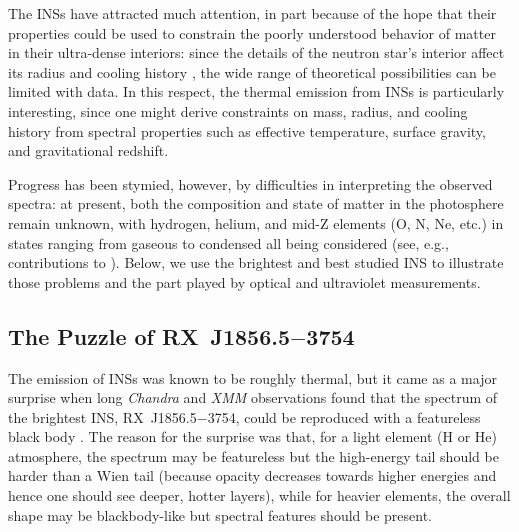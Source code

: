 \documentclass[iop]{emulateapj}
\newcommand{\rxjw}{RX~J1856.5$-$3754}
\begin{document}
The INSs have attracted much attention, in part because of the hope
that their properties could be used to constrain the poorly understood
behavior of matter in their ultra-dense interiors: since the details
of the neutron star's interior affect its radius \citep{lp07} and
cooling history \citep{yp04}, the wide range of theoretical
possibilities can be limited with data.  In this respect, the thermal
emission from INSs is particularly interesting, since one might derive
constraints on mass, radius, and cooling history from spectral
properties such as effective temperature, surface gravity, and
gravitational redshift.

Progress has been stymied, however, by difficulties in interpreting
the observed spectra: at present, both the composition and state of
matter in the photosphere remain unknown, with hydrogen, helium, and
mid-Z elements (O, N, Ne, etc.) in states ranging from gaseous to
condensed all being considered (see, e.g., contributions to
\citealt*{ptz06}).  Below, we use the brightest and best studied INS
to illustrate those problems and the part played by optical and
ultraviolet measurements.

\subsection{The Puzzle of \rxjw}
The emission of INSs was known to be roughly thermal, but it came as a
major surprise when long {\em Chandra} and {\em XMM} observations
found that the spectrum of the brightest INS, \rxjw, could be
reproduced with a featureless black body
\citep[e.g.,][]{bzn+01,bhn+03}.  The reason for the surprise was that,
for a light element (H or He) atmosphere, the spectrum may be
featureless but the high-energy tail should be harder than a Wien tail
(because opacity decreases towards higher energies and hence one
should see deeper, hotter layers), while for heavier elements, the
overall shape may be blackbody-like but spectral features should be
present.
\end{document}
